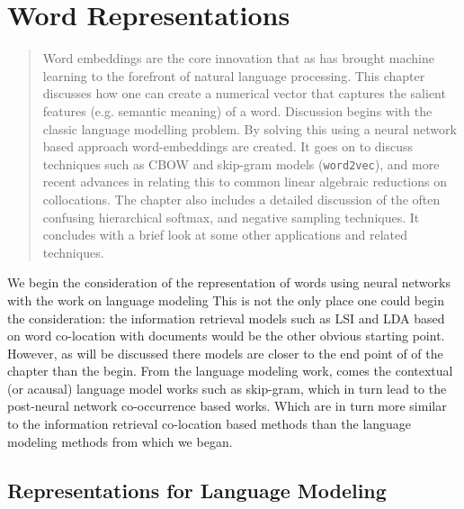 \documentclass[parskip]{komatufte}
\begin{document}
\chapter{Word Representations}\label{sec:word-representations}


\begin{abstract}
Word embeddings are the core innovation that as has brought machine learning to the forefront of natural language processing.
This chapter discusses how one can create a numerical vector that captures the salient features (e.g. semantic meaning) of a word.
Discussion begins with the classic language modelling problem.
By solving this using a neural network based approach word-embeddings are created.
It goes on to discuss techniques such as CBOW and skip-gram models (\texttt{word2vec}), and more recent advances in relating this to common linear algebraic reductions on collocations.
The chapter also includes a detailed discussion of the often confusing hierarchical softmax, and negative sampling techniques.
It concludes with a brief look at some other applications and related techniques.
\end{abstract}


We begin the consideration of the representation of words using neural networks with the work on language modeling
This is not the only place one could begin the consideration: the information retrieval models such as LSI  and LDA  based on word co-location with documents would be the other obvious starting point.
However, as will be discussed there models are closer to the end point of of the chapter than the begin.
From the language modeling work, comes the contextual (or acausal) language model works such as skip-gram, which in turn lead to the post-neural network co-occurrence based works.
Which are in turn more similar to the information retrieval co-location based methods than the language modeling methods from which we began.


\section{Representations for Language Modeling}
\end{document}
